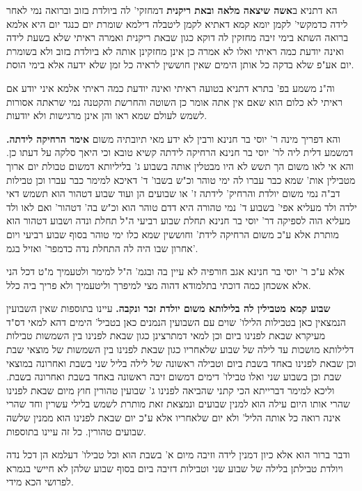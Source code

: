 \documentclass[12pt, openany]{book}
\newcommand{\sethebfont}{
\fontsize{10.5pt}{21.0pt} \selectfont
}
\newcommand{\twocol}[1]{
	{\sethebfont \begin{multicols}{2}
			#1
	\end{multicols}}	
}
\begin{document}
\twocol{הא דתניא ב\textbf{אשה שיצאה מלאה ובאת ריקנית}  דמחזקי' לה ביולדת בזוב וברואה נמי לאחר לידה כדמקשי' לקמן יומא קמא דאתיא לקמן ליטבלה דילמא שומרת יום כנגד יום היא אלמא ברואה השתא בימי זיבה מחזקין לה דוקא כגון שבאת ריקנית ואמרה ראיתי שלא בשעת לידה ואינה יודעת כמה ראיתי ואלו לא אמרה כן אינן מחזקינן אותה לא ביולדת בזוב ולא בשומרת יום אע"פ שלא בדקה כל אותן הימים שאין חוששין לראיה כל זמן שלא ידעה אלא בימי הוסת.\par  וה"נ משמע בפ' בתרא דתניא בטועה ראיתי ואינה יודעת כמה ראיתי אלמא איני יודע אם ראיתי לא כלום הוא שאם אין אתה אומר כן השוטה והחרשת והקטנה נמי שראתה אסורות לשמש לעולם שמא ראו והן אינן מרגישות ולא יודעות. 
\par והא דפריך מינה ר' יוסי בר חנינא ורבין לא ידע מאי תיובתיה משום \textbf{אימר הרחיקה לידתה.}  דמשמע דלית ליה לר' יוסי בר חנינא הרחיקה לידתה קשיא טובא וכי היאך סלקה על דעתו כן. והא אי לאו משום הך תשש לא היו מבטלין אותה בשבוע ג' בליליותא דמשום טבולת יום ארוך מטבילין אות' שמא כבר עברו לה ימי טוהר וכ"ש בשבו' ד' דאיכא למימר כבר עברו וכן טבילות דב"ה נמי משום יולדת והרחיק' לידתה ז' או שבועים הן ועוד שבוע דטהור הוא תשמש דאי ילדה ולד מעליא אפי' בשבוע ד' נמי טהורה היא דדם טוהר הוא וכ"ש בה' דטהור' ואם לאו ולד מעליא הוה לספיקה דר' יוסי בר חנינא תחלת שבוע רביעי ה"ל תחלת ונדה ושבוע דטהור הוא מותרת אלא ע"כ משום הרחיקה לידת' וחוששין שמא כלו ימי טוהר בסוף שבוע רביעי ויום אחרון שבו היה לה התחלת נדה כדמפר' ואזיל בגמ'.\par  אלא ע"כ ר' יוסי בר חנינא אגב חורפיה לא עיין בה ובגמ' ה"ל למימר ולטעמיך מ"ט דכל הני אלא אשכחן כמה דוכתי בתלמודא דהוה מצי למיפרך וליטעמיך ולא פריך ביה כלל. 
\par\textbf{שבוע קמא מטבילין לה בלילותא משום יולדת זכר ונקבה.}  עיינו בתוספות שאין השבועין הנמצאין כאן בטבילות הלילו' שוים עם השבועין הנמנים כאן בטביל' הימים דהא למאי דס"ד מעיקרא שבאת לפנינו ביום וכן למאי דמתרצינן כגון שבאת לפנינו בין השמשות טבילות דלילותא מושכות עד לילה של שבוע שלאחריו כגון שבאת לפנינו בין השמשות של מוצאי שבת וכן שבאת לפנינו באחד בשבת ביום וטבילה ראשונה של לילה בליל שני בשבת ואחרונה במוצאי שבת וכן בשבוע שני ואלו טבילו' דימים דמשום זיבה ראשונה באחד בשבת ואחרונה בשבת. וליכא למימר דברייתא הכי קתני שהביאה לפנינו ג' שבועין טהורין חוץ מיום שבאת לפנינו שהרי אותו היום עילה הוא למנין שבועים ונמצאת זאת מותרת לשמש בלילי עשרין וחד שהרי אינה רואה כל אותה הליל' ולא יום שלאחריו אלא ע"כ יום שבאת לפנינו הוא ממנין שלשה שבועים טהורין. כל זה עיינו בתוספות.\par ודבר ברור הוא אלא כיון דמנין לידה וזיבה מיום א' בשבת הוא וכל טבילו' דעלמא הן דכל נדה ויולדת טבילתן בלילה של שבוע שני וטבילות דזיבה ביום בסוף שבוע שלהן לא חיישי בגמרא לפרושי הכא מידי. 
\par}
\end{document}
